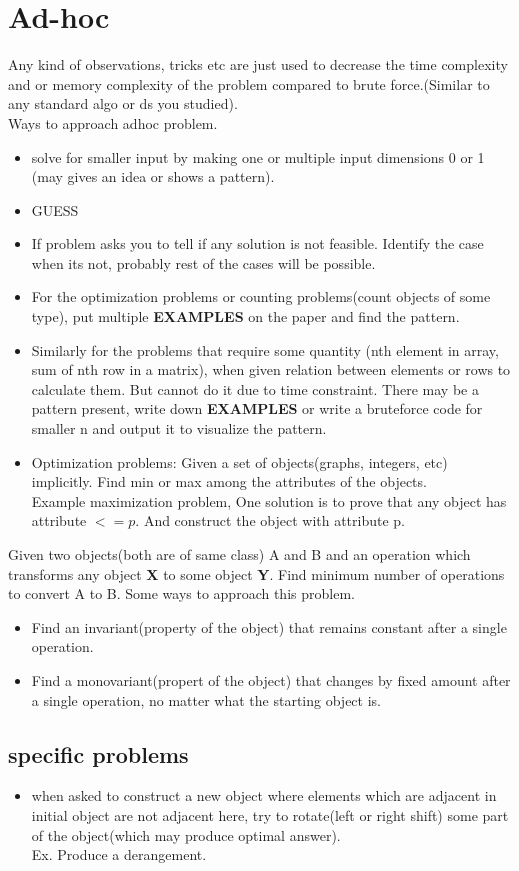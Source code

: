 \documentclass[../Notes.tex]{subfiles}
\begin{document}
\chapter{Ad-hoc}
Any kind of observations, tricks etc are just used to decrease the time complexity and or memory complexity of the problem compared to brute force.(Similar to any standard  algo or ds you studied).\\

Ways to approach adhoc problem.
\begin{itemize}
	\item solve for smaller input by making one or multiple input dimensions 0 or 1 (may gives an idea or shows a pattern).
	\item GUESS
	\item If problem asks you to tell if any solution is not feasible. Identify the case when its not, probably rest of the cases will be possible.

	\item For the optimization problems or counting problems(count objects of some type), put multiple \textbf{EXAMPLES} on the paper and find the pattern.
	\item Similarly for the problems that require some quantity (nth element in array, sum of nth row in a matrix), when given relation between elements or rows to calculate them. But cannot do it due to time constraint. There may be a pattern present, write down \textbf{EXAMPLES} or write a bruteforce code for smaller n and output it to visualize the pattern.
	\item Optimization problems: Given a set of objects(graphs, integers, etc) implicitly. Find min or max among the attributes of the objects.\\ Example maximization problem, One solution is to prove that any object has attribute $<= p$. And construct the object with attribute p.  
\end{itemize}

Given two objects(both are of same class) A and B and an operation which transforms any object \textbf{X} to some object \textbf{Y}. Find minimum number of operations to convert A to B. Some ways to approach this problem.
\begin{itemize}
	\item Find an invariant(property of the object) that remains constant after a single operation.
	\item Find a monovariant(propert of the object) that changes by fixed amount after a single operation, no matter what the starting object is.
\end{itemize}

\section{specific problems}
\begin{itemize}
	\item when asked to construct a new object where elements which are adjacent in initial object are not adjacent here, try to rotate(left or right shift) some part of the object(which may produce optimal answer). \\Ex. Produce a derangement.
\end{itemize}
\end{document}
